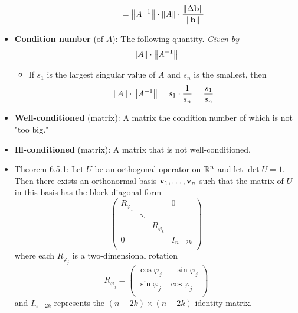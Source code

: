 \documentclass[../../notes.tex]{subfiles}
\begin{document}
\begin{itemize}
\begin{itemize}
\begin{equation*}
            = \norm{A^{-1}}\cdot\norm{A}\cdot\frac{\norm{\Delta\mathbf{b}}}{\norm{\mathbf{b}}}
        \end{equation*}
    \end{itemize}
    \item \textbf{Condition number} (of $A$): The following quantity. \emph{Given by}
    \begin{equation*}
        \norm{A}\cdot\norm{A^{-1}}
    \end{equation*}
    \begin{itemize}
        \item If $s_1$ is the largest singular value of $A$ and $s_n$ is the smallest, then
        \begin{equation*}
            \norm{A}\cdot\norm{A^{-1}} = s_1\cdot\frac{1}{s_n} = \frac{s_1}{s_n}
        \end{equation*}
    \end{itemize}
    \item \textbf{Well-conditioned} (matrix): A matrix the condition number of which is not "too big."
    \item \textbf{Ill-conditioned} (matrix): A matrix that is not well-conditioned.
    \item Theorem 6.5.1: Let $U$ be an orthogonal operator on $\mathbb{R}^n$ and let $\det U=1$. Then there exists an orthonormal basis $\mathbf{v}_1,\dots,\mathbf{v}_n$ such that the matrix of $U$ in this basis has the block diagonal form
    \begin{equation*}
        \begin{pmatrix}
            R_{\varphi_1} &  &  & 0\\
             & \ddots &  & \\
             &  & R_{\varphi_k} & \\
            0 &  &  & I_{n-2k}\\
        \end{pmatrix}
    \end{equation*}
    where each $R_{\varphi_j}$ is a two-dimensional rotation
    \begin{equation*}
        R_{\varphi_j} =
        \begin{pmatrix}
            \cos\varphi_j & -\sin\varphi_j\\
            \sin\varphi_j & \cos\varphi_j\\
        \end{pmatrix}
    \end{equation*}
    and $I_{n-2k}$ represents the $(n-2k)\times(n-2k)$ identity matrix.
    \begin{itemize}

\end{itemize}
\end{itemize}
\end{document}

